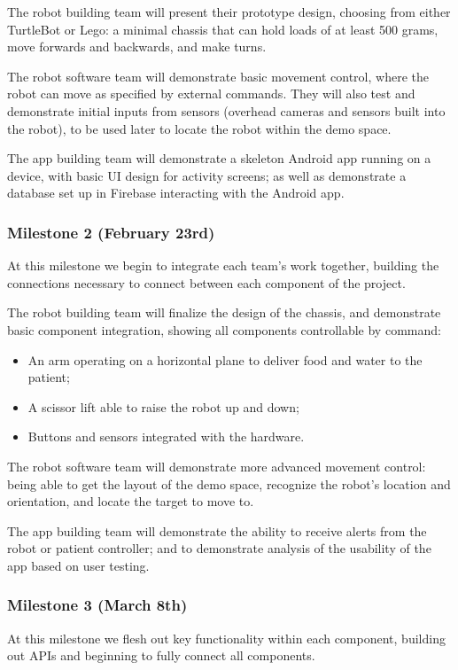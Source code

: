 \documentclass{article}
\begin{document}
The robot building team will present their prototype design, choosing from either TurtleBot or Lego: a minimal chassis that can hold loads of at least 500 grams, move forwards and backwards, and make turns.

The robot software team will demonstrate basic movement control, where the robot can move as specified by external commands. They will also test and demonstrate initial inputs from sensors (overhead cameras and sensors built into the robot), to be used later to locate the robot within the demo space.

The app building team will demonstrate a skeleton Android app running on a device, with basic UI design for activity screens; as well as demonstrate a database set up in Firebase interacting with the Android app. 

\subsubsection{Milestone 2 (February 23rd)}
At this milestone we begin to integrate each team's work together, building the connections necessary to connect between each component of the project. 

The robot building team will finalize the design of the chassis, and demonstrate basic component integration, showing all components controllable by command:
\begin{itemize}
\item An arm operating on a horizontal plane to deliver food and water to the patient;
\item A scissor lift able to raise the robot up and down;
\item Buttons and sensors integrated with the hardware.
\end{itemize}

The robot software team will demonstrate more advanced movement control: being able to get the layout of the demo space, recognize the robot's location and orientation, and locate the target to move to. 

The app building team will demonstrate the ability to receive alerts from the robot or patient controller; and to demonstrate analysis of the usability of the app based on user testing. 

\subsubsection{Milestone 3 (March 8th)}
At this milestone we flesh out key functionality within each component, building out APIs and beginning to fully connect all components. 
\end{document}

